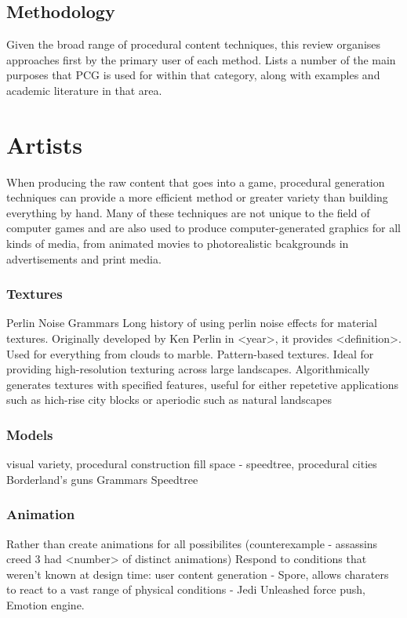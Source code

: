 \documentclass{acm_proc_article-sp}
\begin{document}
\subsection{Methodology}
Given the broad range of procedural content techniques, this review organises approaches first by the primary user of each method. Lists a number of the main purposes that PCG is used for within that category, along with examples and academic literature in that area.


\section{Artists}
When producing the raw content that goes into a game, procedural generation techniques can provide a more efficient method or greater variety than building everything by hand. Many of these techniques are not unique to the field of computer games and are also used to produce computer-generated graphics for all kinds of media, from animated movies to photorealistic bcakgrounds in advertisements and print media.

\subsubsection{Textures}

Perlin Noise
Grammars
Long history of using perlin noise effects for material textures. Originally developed by Ken Perlin in <year>, it provides <definition>. Used for everything from clouds to marble.
Pattern-based textures. Ideal for providing high-resolution texturing across large landscapes. Algorithmically generates textures with specified features, useful for either repetetive applications such as hich-rise city blocks or aperiodic such as natural landscapes \cite{patternTextures}
\subsubsection{Models}
visual variety, procedural construction
fill space - speedtree\cite{speedtree}, procedural cities
Borderland's guns
Grammars
Speedtree
\subsubsection{Animation}
Rather than create animations for all possibilites (counterexample - assassins creed 3 had <number> of distinct animations)
Respond to conditions that weren't known at design time: user content generation - Spore\cite{Spore}, allows charaters to react to a vast range of physical conditions - Jedi Unleashed force push, Emotion engine.
\end{document}
